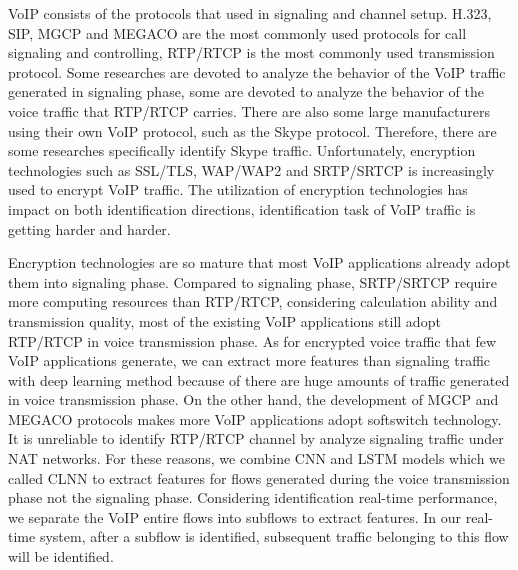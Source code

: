\documentclass[conference]{IEEEtran}
\begin{document}

VoIP consists of the protocols that used in signaling and channel setup. H.323, SIP, MGCP and MEGACO are the most commonly used protocols for call signaling and controlling, RTP/RTCP is the most commonly used transmission protocol. Some researches \cite{14,16,13} are devoted to analyze the behavior of the VoIP traffic generated in signaling phase, some \cite{4,15} are devoted to analyze the behavior of the voice traffic that RTP/RTCP carries. There are also some large manufacturers using their own VoIP protocol, such as the Skype protocol. Therefore, there are some researches \cite{skype1,skype2,skype3} specifically identify Skype traffic. Unfortunately, encryption technologies such as SSL/TLS, WAP/WAP2 and SRTP/SRTCP is increasingly used to encrypt VoIP traffic. The utilization of encryption technologies has impact on both identification directions, identification task of VoIP traffic is getting harder and harder.

Encryption technologies are so mature that most VoIP applications already adopt them into signaling phase. Compared to signaling phase, SRTP/SRTCP require more computing resources than RTP/RTCP, considering calculation ability and transmission quality, most of the existing VoIP applications still adopt RTP/RTCP in voice transmission phase. As for encrypted voice traffic that few VoIP applications generate, we can extract more features than signaling traffic with deep learning method because of there are huge amounts of traffic generated in voice transmission phase. On the other hand, the development of MGCP and MEGACO protocols makes more VoIP applications adopt softswitch technology. It is unreliable to identify RTP/RTCP channel by analyze signaling traffic under NAT networks. For these reasons, we combine CNN and LSTM models which we called CLNN to extract features for flows generated during the voice transmission phase not the signaling phase. 
Considering identification real-time performance, we separate the VoIP entire flows into subflows to extract features. In our real-time system, after a subflow is identified, subsequent traffic belonging to this flow will be identified.
\end{document}
